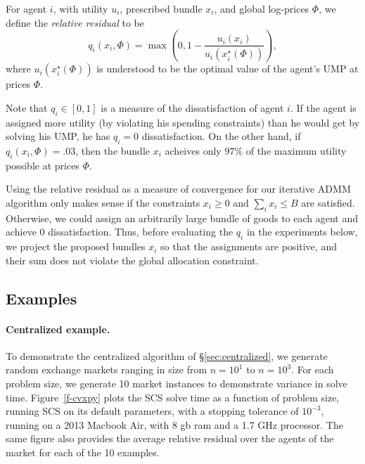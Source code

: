 \documentclass[12pt]{article}
\begin{document}
For agent $i$, with utility $u_i$, prescribed bundle $x_i$, and global log-prices $\Phi$,
we define the \emph{relative residual} to be
\[
q_i(x_i, \Phi)= \max\left(0,1-\frac{u_i(x_i)}{u_i(x_i^\star(\Phi))}\right),
\]
where $u_i(x_i^\star(\Phi))$ is understood to be the optimal value
of the agent's UMP at prices $\Phi$.

Note that $q_i \in [0,1]$ is a measure of the dissatisfaction of agent $i$. If
the agent is assigned more utility (by violating his spending constraints) than
he would get by solving his UMP, he has $q_i = 0$ dissatisfaction. On the other
hand, if $q_i(x_i, \Phi) = .03$, then the bundle $x_i$ acheives
only $97\%$ of the maximum utility possible at prices $\Phi$.

Using the relative residual as a measure of convergence for our iterative ADMM
algorithm only makes sense if the constraints $x_i \geq 0$ and $\sum_i x_i \leq
B$ are satisfied. Otherwise, we could assign an arbitrarily large bundle of
goods  to each agent and achieve $0$ dissatisfaction. Thus, before evaluating
the $q_i$ in the experiments below, we project the proposed bundles $x_i$ so
that the assignments are positive, and their sum does not violate the global
allocation constraint.

\subsection{Examples}

\paragraph{Centralized example.}
\label{sec:centralized_examples}
To demonstrate the centralized algorithm of \S\ref{sec:centralized},
we generate random exchange markets ranging in size from $n=10^1$ to $n=10^3$.
For each problem size, we generate 10 market instances to demonstrate variance
in solve time. Figure~\ref{f-cvxpy} plots the SCS solve time as a function of
problem size, running SCS on its default parameters, with a stopping tolerance
of $10^{-3}$, running on a 2013 Macbook Air, with 8 gb ram and a 1.7 GHz
processor. The same figure also provides the average relative
residual over the agents of the market for each of the 10 examples.
\end{document}
